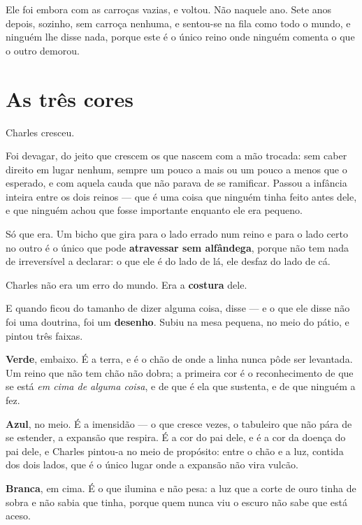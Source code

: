 \documentclass[livro.tex]{subfiles}
\begin{document}
\medskip

Ele foi embora com as carroças vazias, e voltou. Não naquele ano. Sete anos depois, sozinho, sem
carroça nenhuma, e sentou-se na fila como todo o mundo, e ninguém lhe disse nada, porque este é o
único reino onde ninguém comenta o que o outro demorou.

\chapter{As três cores}

Charles cresceu.

Foi devagar, do jeito que crescem os que nascem com a mão trocada: sem caber direito em lugar
nenhum, sempre um pouco a mais ou um pouco a menos que o esperado, e com aquela cauda que não
parava de se ramificar. Passou a infância inteira entre os dois reinos --- que é uma coisa que
ninguém tinha feito antes dele, e que ninguém achou que fosse importante enquanto ele era
pequeno.

Só que era. Um bicho que gira para o lado errado num reino e para o lado certo no outro é o único
que pode \textbf{atravessar sem alfândega}, porque não tem nada de irreversível a declarar: o que
ele é do lado de lá, ele desfaz do lado de cá.

Charles não era um erro do mundo. Era a \textbf{costura} dele.

\medskip

E quando ficou do tamanho de dizer alguma coisa, disse --- e o que ele disse não foi uma
doutrina, foi um \textbf{desenho}. Subiu na mesa pequena, no meio do pátio, e pintou três faixas.

\textbf{Verde}, embaixo. É a terra, e é o chão de onde a linha nunca pôde ser levantada. Um reino
que não tem chão não dobra; a primeira cor é o reconhecimento de que se está \emph{em cima de
alguma coisa}, e de que é ela que sustenta, e de que ninguém a fez.

\textbf{Azul}, no meio. É a imensidão --- o que cresce vezes, o tabuleiro que não pára de se
estender, a expansão que respira. É a cor do pai dele, e é a cor da doença do pai dele, e Charles
pintou-a no meio de propósito: entre o chão e a luz, contida dos dois lados, que é o único lugar
onde a expansão não vira vulcão.

\textbf{Branca}, em cima. É o que ilumina e não pesa: a luz que a corte de ouro tinha de sobra e
não sabia que tinha, porque quem nunca viu o escuro não sabe que está aceso.
\end{document}
